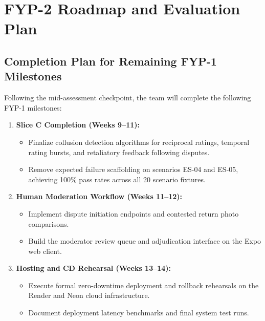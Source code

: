\chapter{FYP-2 Roadmap and Evaluation Plan}

\section{Completion Plan for Remaining FYP-1 Milestones}
Following the mid-assessment checkpoint, the team will complete the following FYP-1 milestones:
\begin{enumerate}
    \item \textbf{Slice C Completion (Weeks 9--11):}
    \begin{itemize}
        \item Finalize collusion detection algorithms for reciprocal ratings, temporal rating bursts, and retaliatory feedback following disputes.
        \item Remove expected failure scaffolding on scenarios ES-04 and ES-05, achieving 100\% pass rates across all 20 scenario fixtures.
    \end{itemize}
    \item \textbf{Human Moderation Workflow (Weeks 11--12):}
    \begin{itemize}
        \item Implement dispute initiation endpoints and contested return photo comparisons.
        \item Build the moderator review queue and adjudication interface on the Expo web client.
    \end{itemize}
    \item \textbf{Hosting and CD Rehearsal (Weeks 13--14):}
    \begin{itemize}
        \item Execute formal zero-downtime deployment and rollback rehearsals on the Render and Neon cloud infrastructure.
        \item Document deployment latency benchmarks and final system test runs.
    \end{itemize}
\end{enumerate}

